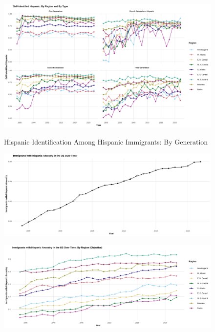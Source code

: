 \documentclass[12pt, fullpage]{article}
\begin{document}
\newpage
\pagebreak

\begin{center}
\begin{figure}[H]
\caption{Hispanic Identification Among Hispanic Immigrants: By Generation}
\includegraphics[width=\textwidth]{figure/Hispanics_type.png} 
\label{fig:hispregtype}
\end{figure}
\end{center}

\begin{center}
\begin{figure}[H]
\includegraphics[width=\textwidth]{figure/Hispanics_all_Obj.png} 
\end{figure}
\end{center}


\begin{center}
\begin{figure}[H]
\includegraphics[width=\textwidth]{figure/Hispanics_Obj.png} 
\end{figure}
\end{center}
\end{document}
